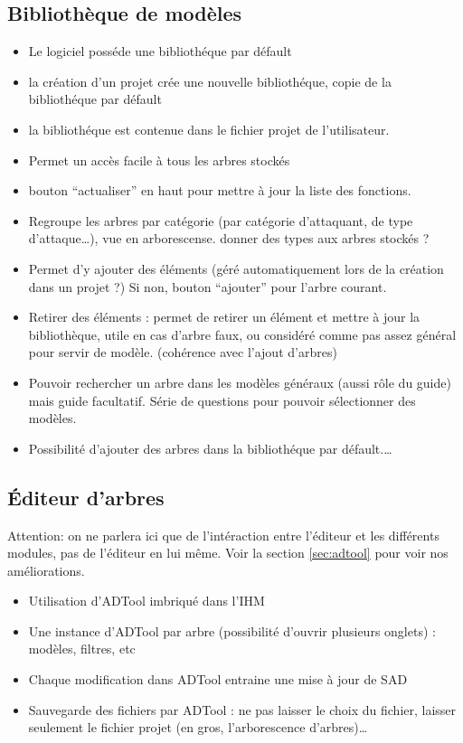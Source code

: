 	\subsection{Bibliothèque de modèles}

		\begin{itemize}
			\item Le logiciel posséde une bibliothéque par défault
			\item la création d'un projet crée une nouvelle bibliothéque, copie de la bibliothéque par défault
			\item la bibliothéque est contenue dans le fichier projet de l'utilisateur. 
			\item Permet un accès facile à tous les arbres stockés
			\item bouton “actualiser” en haut pour mettre à jour la liste des fonctions.
			\item Regroupe les arbres par catégorie (par catégorie d’attaquant, de type d’attaque…), vue en arborescense. 	donner des types aux arbres stockés ?
			\item Permet d’y ajouter des éléments (géré automatiquement lors de la création dans un projet ?) Si non, bouton “ajouter” pour l’arbre courant. 
			\item Retirer des éléments : permet de retirer un élément et mettre à jour la bibliothèque, utile en cas d’arbre faux, ou considéré comme pas assez général pour servir de modèle. (cohérence avec l’ajout d’arbres)
			\item Pouvoir rechercher un arbre dans les modèles généraux (aussi rôle du guide) mais guide facultatif. Série de questions pour pouvoir sélectionner des modèles.
			\item Possibilité d'ajouter des arbres dans la bibliothéque par défault.\ldots
		\end{itemize}
		

	\subsection{Éditeur d'arbres}

		Attention: on ne parlera ici que de l'intéraction entre l'éditeur et les différents modules, pas de l'éditeur en lui même.
		Voir la section \ref{sec:adtool} pour voir nos améliorations.

		\begin{itemize}
			\item  Utilisation d'ADTool imbriqué dans l'IHM
			\item Une instance d'ADTool par arbre (possibilité d'ouvrir plusieurs onglets) : modèles, filtres, etc
			\item Chaque modification dans ADTool entraine une mise à jour de SAD
			\item Sauvegarde des fichiers par ADTool : ne pas laisser le choix du fichier, laisser seulement le fichier projet (en gros, l'arborescence d'arbres)\ldots
		\end{itemize}


